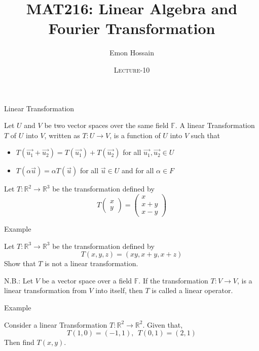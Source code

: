 \documentclass[11pt]{beamer}
\author[] %
{Emon Hossain\inst{1}}
\institute[University of Dhaka] %
{
  \inst{1}%
  Lecturer\\MNS department\\Brac University
}
\date[] %
{\textsc{Lecture-10}}
\title[]{MAT216: Linear Algebra and Fourier Transformation}
\theoremstyle{plain}
\begin{document}
\begin{frame}
\titlepage
\end{frame}

\begin{frame}{Linear Transformation}
    \begin{definition}
        Let $U$ and $V$ be two vector spaces over the same field $\mathbb F$. A linear Transformation $T$ of $U$ into $V$, written as $T: U \rightarrow V$, is a function of $U$ into $V$ such that
        \begin{itemize}
            \item $T\left(\overrightarrow{u_1}+\overrightarrow{u_2}\right)=T\left(\overrightarrow{u_1}\right)+T\left(\overrightarrow{u_2}\right)$ for all $\overrightarrow{u_1}, \overrightarrow{u_2} \in U$ 
            \item $T(\alpha \vec{u})=\alpha T(\vec{u})$ for all $\vec{u} \in U$ and for all $\alpha \in F$
        \end{itemize}
    \end{definition}
    \begin{example}
        Let $T:\mathbb R^2\rightarrow\mathbb R^3$ be the transformation defined by $$T\begin{pmatrix}
            x\\y
        \end{pmatrix}=\begin{pmatrix}
            x\\x+y\\x-y
        \end{pmatrix}$$
    \end{example}
\end{frame}

\begin{frame}{Example}
    \begin{example}
        Let $T:\mathbb R^3\rightarrow\mathbb R^3$ be the transformation defined by $$T(x,y,z)=(xy,x+y,x+z)$$
        Show that $T$ is not a linear transformation.
    \end{example}
    N.B.: Let $V$ be a vector space over a field $\mathbb F$. If the transformation $T:V\rightarrow V$, is a linear transformation from $V$ into itself, then $T$ is called a linear operator.
\end{frame}

\begin{frame}{Example}
    \begin{example}
        Consider a linear Transformation $T:\mathbb R^2\rightarrow\mathbb R^2$. Given that, 
    $$T(1,0)=(-1,1),\:\:T(0,1)=(2,1)$$
    Then find $T(x,y)$.
    \end{example}
\end{frame}
\end{document}
